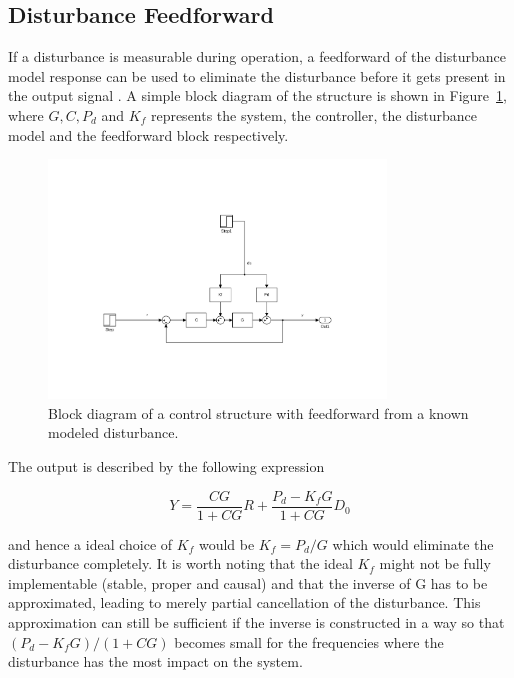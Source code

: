 \subsection{Disturbance Feedforward}\label{subsec:distff}
If a disturbance is measurable during operation, a feedforward of the disturbance model response can be used to eliminate the disturbance before it gets present in the output signal \citep{industrial}. A simple block diagram of the structure is shown in Figure~\ref{fig:ffdist}, where $G, C, P_d$ and $K_f$ represents the system, the controller, the disturbance model and the feedforward block respectively.

\begin{figure}[h]
  \centering %
  \includegraphics[width=0.8\textwidth, trim=8cm 4.5cm 5.97cm 8.5cm, clip=true]{fig/matlab/ffdist}
  \caption{\label{fig:ffdist}Block diagram of a control structure with feedforward from a known modeled disturbance.}
\end{figure}

The output is described by the following expression

\begin{equation}
  \label{eq:ffdist}
  Y = \frac{CG}{1+CG}R + \frac{P_d - K_fG}{1+CG}D_0
\end{equation}

and hence a ideal choice of $K_f$ would be $K_f=P_d/G$ which would eliminate the disturbance completely. It is worth noting that the ideal $K_f$ might not be fully implementable (stable, proper and causal) and that the inverse of G has to be approximated, leading to merely partial cancellation of the disturbance. This approximation can still be sufficient if the inverse is constructed in a way so that $(P_d - K_fG)/(1+CG)$ becomes small for the frequencies where the disturbance has the most impact on the system.

